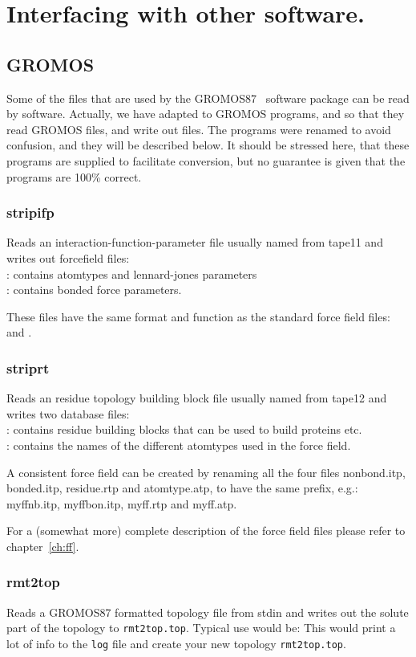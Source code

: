 \chapter{Interfacing with other software.}
\section{GROMOS}
Some of the files that are used by the GROMOS87~\cite{biomos} software
package can be read by {\gromacs} software. Actually, we have adapted
to GROMOS programs,  and  so that they
read GROMOS files, and write out {\gromacs} files. The programs were
renamed to avoid confusion, and they will be described below.
It should be stressed here, that these programs are supplied to
facilitate conversion, but no guarantee is given that the
programs are 100\% correct.

\subsection{stripifp}
Reads an interaction-function-parameter file usually named
 from tape11
and writes out {\gromacs} forcefield files:\\
: contains atomtypes and lennard-jones parameters\\
: contains bonded force parameters.

These files have the same format and function as the standard {\gromacs}
force field files:  and .

\subsection{striprt}
Reads an residue topology building block file usually named
 from tape12
and writes two {\gromacs} database files:\\
: contains residue building blocks that can be used to build proteins etc.\\
: contains the names of the different atomtypes used in the force field.

A consistent force field can be created by renaming all the four files
nonbond.itp, bonded.itp, residue.rtp and atomtype.atp, to have the same
prefix, e.g.:
myffnb.itp, myffbon.itp, myff.rtp and myff.atp.

For a (somewhat more) complete description of the force field files please
refer to chapter~\ref{ch:ff}.

\subsection{rmt2top}
Reads a GROMOS87 formatted topology file from stdin and writes out
the solute part of the topology to {\tt rmt2top.top}. Typical use
would be: 
This would print a lot of info to the {\tt log} file and create your
new {\gromacs} topology {\tt rmt2top.top}.

